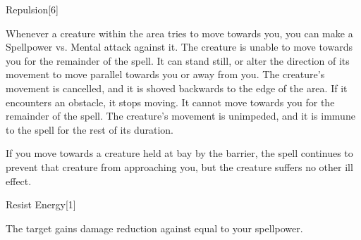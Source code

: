 \begin{spellsection}{Repulsion}[6]
    \begin{spellheader}
    \end{spellheader}
    \begin{spellcontent}
        \begin{spelltargetinginfo}
        \end{spelltargetinginfo}
        \begin{spelleffects}
            Whenever a creature within the area tries to move towards you, you can make a Spellpower vs. Mental attack against it.
            \spellsuccess The creature is unable to move towards you for the remainder of the spell. It can stand still, or alter the direction of its movement to move parallel towards you or away from you.
            \spellcritical The creature's movement is cancelled, and it is shoved backwards to the edge of the area.
            If it encounters an obstacle, it stops moving. It cannot move towards you for the remainder of the spell.
            \spellfailure The creature's movement is unimpeded, and it is immune to the spell for the rest of its duration.
            \spelldur \durshort \dismissable
        \end{spelleffects}
    \end{spellcontent}
    \begin{spellfooter}
        \spellnotes If you move towards a creature held at bay by the barrier, the spell continues to prevent that creature from approaching you, but the creature suffers no other ill effect.
        \miscastexplode
    \end{spellfooter}
\end{spellsection}

\begin{spellsection}{Resist Energy}[1]
    \begin{spellheader}
    \end{spellheader}
    \begin{spellcontent}
        \begin{spelltargetinginfo}
        \end{spelltargetinginfo}
        \begin{spelleffects}
            \spelleffect The target gains damage reduction against  equal to your spellpower.
            \spelldur \durshort
        \end{spelleffects}
    \end{spellcontent}
    \begin{spellfooter}
        \miscastexplode
    \end{spellfooter}
    \begin{spellaugments}
    \end{spellaugments}
\end{spellsection}

